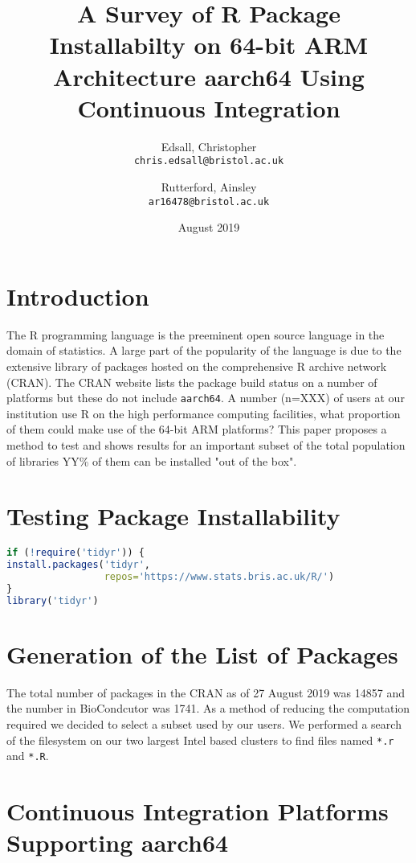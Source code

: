 \documentclass{article}
\title{A Survey of R Package Installabilty on 64-bit ARM Architecture aarch64 Using Continuous Integration}
\author{Edsall, Christopher\\
  \texttt{chris.edsall@bristol.ac.uk}
  \and
  Rutterford, Ainsley\\
  \texttt{ar16478@bristol.ac.uk}
}
\date{August 2019}
\begin{document}
\maketitle

\section{Introduction}
The R programming language is the preeminent open source language in the domain of statistics. A large part of the popularity of the language is due to the extensive library of packages hosted on the comprehensive R archive network (\textsc{CRAN}). The \textsc{CRAN} website lists the package build status on a number of platforms but these do not include \texttt{aarch64}. A number (n=XXX) of users at our institution use R on the high performance computing facilities, what proportion of them could make use of the 64-bit ARM platforms? This paper proposes a method to test and shows results for an important subset of the total population of libraries YY\% of them can be installed "out of the box". 

\section{Testing Package Installability}

\begin{lstlisting}[language=R, caption=Testing that package \texttt{tidyr} can be installed and loaded]
if (!require('tidyr')) {
install.packages('tidyr',
                 repos='https://www.stats.bris.ac.uk/R/')
}
library('tidyr')
\end{lstlisting}


\section{Generation of the List of Packages}

The total number of packages in the \textsc{CRAN} as of 27 August 2019 was 14857 and the number in BioCondcutor was 1741. As a method of reducing the computation required we decided to select a subset used by our users. We performed a search of the filesystem on our two largest Intel based clusters to find files named \texttt{*.r} and \texttt{*.R}.

\section{Continuous Integration Platforms Supporting aarch64}
\end{document}
